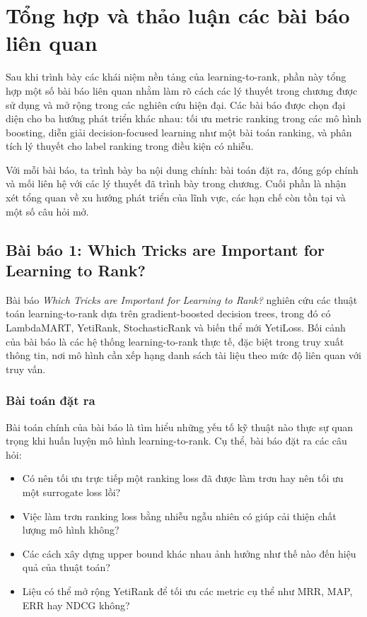 \section{Tổng hợp và thảo luận các bài báo liên quan}

Sau khi trình bày các khái niệm nền tảng của learning-to-rank, phần này tổng hợp một số bài báo liên quan nhằm làm rõ cách các lý thuyết trong chương được sử dụng và mở rộng trong các nghiên cứu hiện đại. Các bài báo được chọn đại diện cho ba hướng phát triển khác nhau: tối ưu metric ranking trong các mô hình boosting, diễn giải decision-focused learning như một bài toán ranking, và phân tích lý thuyết cho label ranking trong điều kiện có nhiễu.

Với mỗi bài báo, ta trình bày ba nội dung chính: bài toán đặt ra, đóng góp chính và mối liên hệ với các lý thuyết đã trình bày trong chương. Cuối phần là nhận xét tổng quan về xu hướng phát triển của lĩnh vực, các hạn chế còn tồn tại và một số câu hỏi mở.

\subsection{Bài báo 1: Which Tricks are Important for Learning to Rank?}

Bài báo \textit{Which Tricks are Important for Learning to Rank?} nghiên cứu các thuật toán learning-to-rank dựa trên gradient-boosted decision trees, trong đó có LambdaMART, YetiRank, StochasticRank và biến thể mới YetiLoss. Bối cảnh của bài báo là các hệ thống learning-to-rank thực tế, đặc biệt trong truy xuất thông tin, nơi mô hình cần xếp hạng danh sách tài liệu theo mức độ liên quan với truy vấn.

\subsubsection{Bài toán đặt ra}

Bài toán chính của bài báo là tìm hiểu những yếu tố kỹ thuật nào thực sự quan trọng khi huấn luyện mô hình learning-to-rank. Cụ thể, bài báo đặt ra các câu hỏi:

\begin{itemize}
    \item Có nên tối ưu trực tiếp một ranking loss đã được làm trơn hay nên tối ưu một surrogate loss lồi?
    \item Việc làm trơn ranking loss bằng nhiễu ngẫu nhiên có giúp cải thiện chất lượng mô hình không?
    \item Các cách xây dựng upper bound khác nhau ảnh hưởng như thế nào đến hiệu quả của thuật toán?
    \item Liệu có thể mở rộng YetiRank để tối ưu các metric cụ thể như MRR, MAP, ERR hay NDCG không?
\end{itemize}

